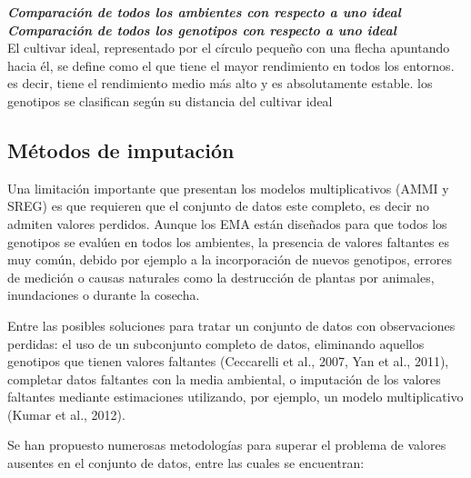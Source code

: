 \textbf{\emph{Comparación de todos los ambientes con respecto a uno ideal}}\\




\textbf{\emph{Comparación de todos los genotipos con respecto a uno ideal}}\\

El cultivar ideal, representado por el círculo pequeño con una flecha apuntando hacia él, se define como el que tiene el mayor rendimiento en todos los entornos. es decir, tiene el rendimiento medio más alto y es absolutamente estable. los genotipos se clasifican según su distancia del cultivar ideal

\subsection{Métodos de imputación}


Una limitación importante que presentan los modelos multiplicativos (AMMI y SREG) es que requieren que el conjunto de datos este completo, es decir no admiten valores perdidos. Aunque los EMA están diseñados para que todos los genotipos se evalúen en todos los ambientes, la presencia de valores faltantes es muy común, debido por ejemplo a la incorporación de nuevos genotipos, errores de medición o causas naturales como la destrucción de plantas por animales, inundaciones o durante la cosecha.

Entre las posibles soluciones para tratar un conjunto de datos con observaciones perdidas: el uso de un subconjunto completo de datos, eliminando aquellos genotipos que tienen valores faltantes (Ceccarelli et al., 2007, Yan et al., 2011), completar datos faltantes con la media ambiental, o imputación de los valores faltantes mediante estimaciones utilizando, por ejemplo, un modelo multiplicativo (Kumar et al., 2012).

Se han propuesto numerosas metodologías para superar el problema de valores ausentes en el conjunto de datos, entre las cuales se encuentran:

